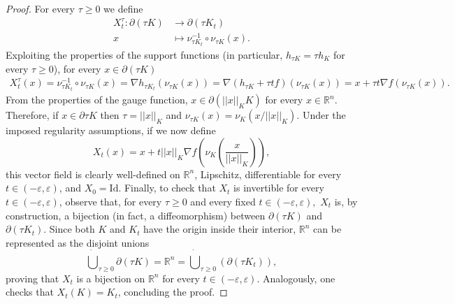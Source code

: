 \documentclass[a4paper, 11pt]{article}
\newcommand{\R}{\mathbb{R}}
\newcommand{\Id}{\mathrm{Id}}
\theoremstyle{definition}
\begin{document}
\begin{proof}
    For every $\tau \geq 0$ we define 
    \begin{align*}
    X^\tau_t : \partial (\tau K) &\to \partial (\tau K_t) \\
    x &\mapsto \nu^{-1}_{\tau K_t}\circ \nu_{\tau K}(x).
\end{align*}
Exploiting the properties of the support functions (in particular, $h_{\tau K}=\tau h_K$ for every $\tau \geq 0$), for every $x \in \partial (\tau K)$ 
\begin{align*}
    X^\tau_t(x)=\nu^{-1}_{\tau K_t} \circ \nu_{\tau K}(x)= \nabla h_{\tau K_t}(\nu_{\tau K}(x))=\nabla(h_{\tau K}+\tau t f)(\nu_{\tau K}(x))=x+\tau t \nabla f(\nu_{\tau K}(x)).
\end{align*}
From the properties of the gauge function, $x \in \partial (||x||_K K)$ for every $x \in \R^n$. Therefore, if $x \in \partial \tau K$ then $\tau = ||x||_K$ and $\nu_{\tau K}(x)=\nu_K(x/||x||_K)$. Under the imposed regularity assumptions, if we now define 
\[ X_t(x)=x+t ||x||_K \nabla f \left( \nu_K\left( \frac{x}{||x||_K}\right)\right), \] this vector field is clearly well-defined on $\R^n$, Lipschitz, differentiable for every $t \in (-\varepsilon,\varepsilon)$, and $X_0=\Id$. Finally, to check that $X_t$ is invertible for every $t \in (-\varepsilon,\varepsilon)$, observe that, for every $\tau\geq 0$ and every fixed $t \in (-\varepsilon,\varepsilon),$ $X_t$ is, by construction, a bijection (in fact, a diffeomorphism) between $\partial (\tau K)$ and $\partial (\tau K_t)$. Since both $K$ and $K_t$ have the origin inside their interior, $\R^n$ can be represented as the disjoint unions \[ \dot{\bigcup}_{\tau \geq 0} \partial (\tau K) = \R^n = \dot{\bigcup}_{\tau \geq 0}( \partial (\tau K_t)),\] proving that $X_t$ is a bijection on $\R^n$ for every $t \in (-\varepsilon,\varepsilon)$. Analogously, one checks that $X_t(K)=K_t$, concluding the proof.
\end{proof}
\end{document}
